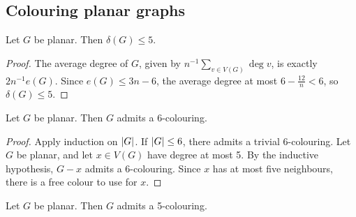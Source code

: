 \subsection{Colouring planar graphs}
\begin{proposition}
	Let \( G \) be planar.
	Then \( \delta(G) \leq 5 \).
\end{proposition}
\begin{proof}
	The average degree of \( G \), given by \( n^{-1} \sum_{v \in V(G)} \deg v \), is exactly \( 2 n^{-1} e(G) \).
	Since \( e(G) \leq 3n - 6 \), the average degree at most \( 6 - \frac{12}{n} < 6 \), so \( \delta(G) \leq 5 \).
\end{proof}
\begin{proposition}
	Let \( G \) be planar.
	Then \( G \) admits a 6-colouring.
\end{proposition}
\begin{proof}
	Apply induction on \( \abs{G} \).
	If \( \abs{G} \leq 6 \), there admits a trivial 6-colouring.
	Let \( G \) be planar, and let \( x \in V(G) \) have degree at most 5.
	By the inductive hypothesis, \( G - x \) admits a 6-colouring.
	Since \( x \) has at most five neighbours, there is a free colour to use for \( x \).
\end{proof}
\begin{theorem}
	Let \( G \) be planar.
	Then \( G \) admits a 5-colouring.
\end{theorem}
